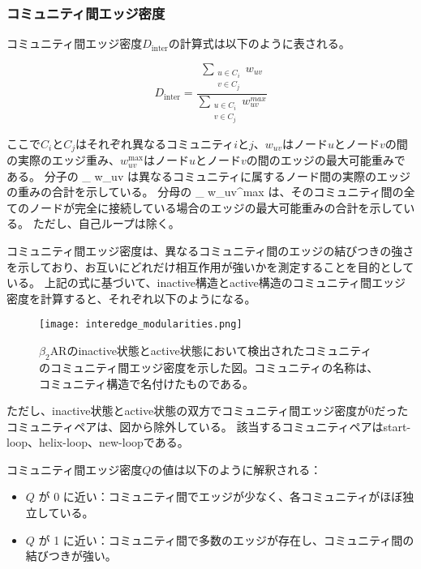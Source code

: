 \subsubsection{コミュニティ間エッジ密度}
コミュニティ間エッジ密度$D_{\text{inter}}$の計算式は以下のように表される。

\[
D_{\text{inter}} = \frac{\sum_{\substack{u \in C_i \\ v \in C_j}} w_{uv}}{\sum_{\substack{u \in C_i \\ v \in C_j}} w_{uv}^{max}}
\label{eq:inter_density}
\]

ここで$C_i$と$C_j$はそれぞれ異なるコミュニティ$i$と$j$、$w_{uv}$はノード$u$とノード$v$の間の実際のエッジ重み、$w_{uv}^{\text{max}}$はノード$u$とノード$v$の間のエッジの最大可能重みである。
分子の \sum_{} w_{uv} は異なるコミュニティに属するノード間の実際のエッジの重みの合計を示している。
分母の \sum_{} w_{uv}^{max} は、そのコミュニティ間の全てのノードが完全に接続している場合のエッジの最大可能重みの合計を示している。
ただし、自己ループは除く。

コミュニティ間エッジ密度は、異なるコミュニティ間のエッジの結びつきの強さを示しており、お互いにどれだけ相互作用が強いかを測定することを目的としている。
上記の式に基づいて、inactive構造とactive構造のコミュニティ間エッジ密度を計算すると、それぞれ以下のようになる。

\begin{figure}[htbp]
    \centering
    \texttt{[image: interedge\_modularities.png]}
    \caption{$\beta_2$ARのinactive状態とactive状態において検出されたコミュニティのコミュニティ間エッジ密度を示した図。コミュニティの名称は、コミュニティ構造で名付けたものである。}
    \label{fig:inter}
\end{figure}

\newpage

ただし、inactive状態とactive状態の双方でコミュニティ間エッジ密度が0だったコミュニティペアは、図から除外している。
該当するコミュニティペアはstart-loop、helix-loop、new-loopである。

コミュニティ間エッジ密度$Q$の値は以下のように解釈される：
\begin{itemize}
    \item \( Q \) が 0 に近い：コミュニティ間でエッジが少なく、各コミュニティがほぼ独立している。
    \item \( Q \) が 1 に近い：コミュニティ間で多数のエッジが存在し、コミュニティ間の結びつきが強い。
\end{itemize}

